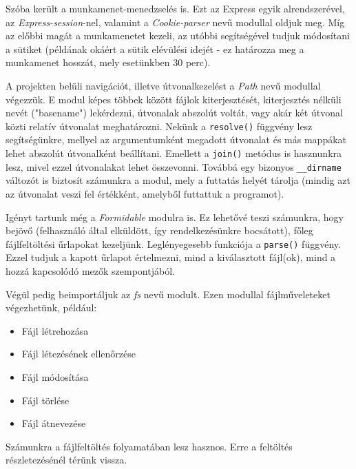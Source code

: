 Szóba került a munkamenet-menedzselés is. Ezt az Express egyik alrendszerével, az \textit{Express-session}-nel, valamint a \textit{Cookie-parser} nevű modullal oldjuk meg. Míg az előbbi magát a munkamenetet kezeli, az utóbbi segítségével tudjuk módosítani a sütiket (példának okáért a sütik elévülési idejét - ez határozza meg a munkamenet hosszát, mely esetünkben 30 perc).

A projekten belüli navigációt, illetve útvonalkezelést a \textit{Path} nevű modullal végezzük. E modul képes többek között fájlok kiterjesztését, kiterjesztés nélküli nevét ("basename") lekérdezni, útvonalak abszolút voltát, vagy akár két útvonal közti relatív útvonalat meghatározni. Nekünk a \texttt{resolve()} függvény lesz segítségünkre, mellyel az argumentumként megadott útvonalat és más mappákat lehet abszolút útvonalként beállítani. Emellett a \texttt{join()} metódus is hasznunkra lesz, mivel ezzel útvonalakat lehet összevonni. Továbbá egy bizonyos \texttt{\_\_dirname} változót is biztosít számunkra a modul, mely a futtatás helyét tárolja (mindig azt az útvonalat veszi fel értékként, amelyből futtattuk a programot).

Igényt tartunk még a \textit{Formidable} modulra is. Ez lehetővé teszi számunkra, hogy bejövő (felhasználó által elküldött, így rendelkezésünkre bocsátott), főleg fájlfeltöltési űrlapokat kezeljünk. Leglényegesebb funkciója a \texttt{parse()} függvény. Ezzel tudjuk a kapott űrlapot értelmezni, mind a kiválasztott fájl(ok), mind a hozzá kapcsolódó mezők szempontjából.

Végül pedig beimportáljuk az \textit{fs} nevű modult. Ezen modullal fájlműveleteket végezhetünk, például:
\begin{itemize}
\item{Fájl létrehozása}
\item{Fájl létezésének ellenőrzése}
\item{Fájl módosítása}
\item{Fájl törlése}
\item{Fájl átnevezése}
\end{itemize}
Számunkra a fájlfeltöltés folyamatában lesz hasznos. Erre a feltöltés részletezésénél térünk vissza.



